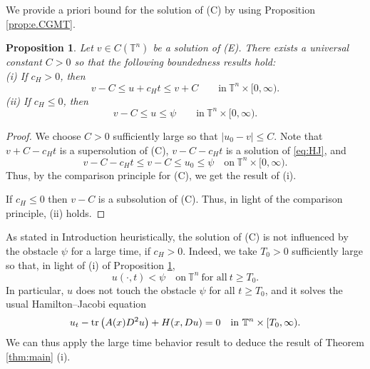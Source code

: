 \documentclass[12pt,reqno]{amsart}
\theoremstyle{plain}
\newtheorem{prop}[thm]{Proposition}
\theoremstyle{remark}
\numberwithin{equation}{section}
\begin{document}
We provide a priori bound for the solution of (C) 
by using Proposition \ref{prop:e.CGMT}. 
\begin{prop}\label{prop:bound}
Let $v\in C({\mathbb{T}}^n)$ be a solution of {\rm (E)}.
There exists a universal constant $C>0$ so that the following boundedness results hold:
\\
{\rm(i)} 
If $c_H>0$, then 
$$
v-C \leq u+c_Ht \leq v+ C \qquad \text{in}\ {\mathbb{T}^{n}\times[0,\infty)}.
$$
{\rm(ii)} 
If $c_H\leq 0$, then
$$
v-C \leq u \leq \psi \qquad \text{in}\ {\mathbb{T}^{n}\times[0,\infty)}.
$$
\end{prop}

\begin{proof}
We  choose $C>0$ sufficiently large so that $|u_0-v|\le C$.
Note that $v+C-c_Ht$ is a supersolution of (C), 
$v-C-c_Ht$ is a solution of \eqref{eq:HJ}, and 
\[
v-C-c_Ht \leq v-C\leq u_0 \leq \psi \quad \text{on} \ {\mathbb{T}^{n}\times[0,\infty)}.
\]
Thus, by the comparison principle for (C), we get the result of (i). 

If $c_H \leq 0$ then $v-C$ is a subsolution of (C).
Thus, in light of the comparison principle, (ii) holds.
\end{proof}

As stated in Introduction heuristically,  
the solution of (C) is not influenced by the obstacle $\psi$ for a large time, if 
$c_H > 0$. 
Indeed, 
we take $T_0>0$ sufficiently large so that, in light of (i) of Proposition \ref{prop:bound},
$$
u(\cdot,t) < \psi \quad \text{on} \ {\mathbb{T}}^n \ \text{for all} \ t \geq T_0.
$$
In particular, $u$ does not touch the obstacle $\psi$ for all $t \geq T_0$, and it solves the usual Hamilton--Jacobi equation
$$
u_t-{{\rm tr}\,}\big(A(x)D^2u\big)+H(x,Du)=0 \quad \text{in} \ {\mathbb{T}}^n \times [T_0,\infty).
$$
We can thus apply the large time behavior result \cite[Theorem 1.1]{CGMT} to deduce the result of Theorem \ref{thm:main} (i). 
\end{document}

